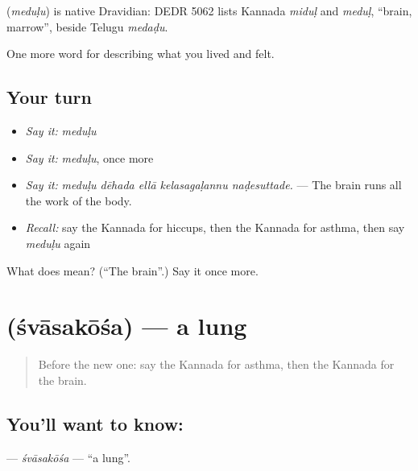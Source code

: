 \begin{cousinweb}
\textbf{} (\emph{meduḷu}) is native Dravidian: DEDR 5062 lists Kannada \emph{miduḷ} and \emph{meduḷ}, \textquotedblleft{}brain, marrow\textquotedblright{}, beside Telugu \emph{medaḍu}.
\end{cousinweb}

\begin{grammarlens}[title={What you've built}]
One more word for describing what you lived and felt.
\end{grammarlens}

\subsection*{Your turn}
\begin{itemize}
\raggedright
  \item \emph{Say it:} \emph{meduḷu}
  \item \emph{Say it:} \emph{meduḷu}, once more
  \item \emph{Say it:} \emph{meduḷu dēhada ellā kelasagaḷannu naḍesuttade.} — The brain runs all the work of the body.
  \item \emph{Recall:} say the Kannada for hiccups, then the Kannada for asthma, then say \emph{meduḷu} again
\end{itemize}

\begin{tcolorbox}[breakable,colback=teal!4,colframe=teal!35!black,title={Before you move on}]
What does  mean? (\textquotedblleft{}The brain\textquotedblright{}.) Say it once more.
\end{tcolorbox}
\section[\texorpdfstring{\kn{ಶ್ವಾಸಕೋಶ} (śvāsakōśa)}{ಶ್ವಾಸಕೋಶ (śvāsakōśa)}]{ (śvāsakōśa) — a lung}

\label{lesson:KA-C508-svasakosa}



\begin{quote}
Before the new one: say the Kannada for asthma, then the Kannada for the brain.
\end{quote}

\subsection*{You'll want to know: }
\textbf{} — \emph{śvāsakōśa} — \textquotedblleft{}a lung\textquotedblright{}.

